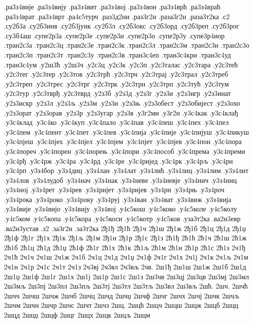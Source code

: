 {.ра3з4вије
.ра3з4вију
.ра3з4вит
.ра3з4вој
.ра3з4вон
.ра3з4врћ
.ра3з4враћ
.ра3з4врат
.ра3з4врт
.ра4с5турч
.раз3д2ни
.раз3г2н
.раза3г2н
.раза3т2ка
.с2
.су2б3а
.су2б3инв
.су2б3јунк
.су2б3л
.су2б3окс
.су2б3орд
.су2б3реп
.су2б3рог
.су3б4аш
.супе2р3а
.супе2р3е
.супе2р3и
.супе2р3о
.супе2р3у
.супе3р4иор
.тран2с3а
.тран2с3ц
.тран2с3е
.тран2с3к
.тран2с3л
.тран2с3м
.тран2с3н
.тран2с3о
.тран2с3п
.тран2с3т
.тран2с3у
.тран2с3в
.тран3с4еп
.тран3с4кри
.тран3с4уд
.тран3с4ум
.у2ш3ћ
.у2ш3ч
.у2с3ц
.у2с3к
.у2с3п
.у2с3талас
.у2с3тара
.у2с3тећ
.у2с3тег
.у2с3тер
.у2с3тов
.у2с3трћ
.у2с3трч
.у2с3трај
.у2с3трал
.у2с3треб
.у2с3треп
.у2с3трес
.у2с3трг
.у2с3трк
.у2с3трн
.у2с3трп
.у2с3тућ
.у2с3тум
.у2с3тур
.у2с3тврђ
.у2с3тврд
.у2з3б
.у2з3д
.у2з3г
.у2з3и
.у2з3игр
.у2з3инат
.у2з3искр
.у2з3л
.у2з3љ
.у2з3м
.у2з3н
.у2з3њ
.у2з3обест
.у2з3обијест
.у2з3охо
.у2з3орат
.у2з3орав
.у2з3р
.у2з3угар
.у2з3в
.у3г2ми
.у3г2н
.у3с4как
.у3с4клађ
.у3с4клад
.у3с4ко
.у3с4куп
.у3с4пало
.у3с4пав
.у3с4пеш
.у3с4пех
.у3с4пел
.у3с4пем
.у3с4пент
.у3с4пет
.у3с4пев
.у3с4пија
.у3с4пије
.у3с4пијуш
.у3с4пикуш
.у3с4пјеш
.у3с4пјех
.у3с4пјел
.у3с4пјем
.у3с4пјет
.у3с4пјев
.у3с4пон
.у3с4пора
.у3с4пореч
.у3с4порен
.у3с4порењ
.у3с4пори
.у3с4пособ
.у3с4према
.у3с4преми
.у3с4рђ
.у3с4рж
.у3с4ра
.у3с4рд
.у3с4ре
.у3с4ријед
.у3с4рк
.у3с4рљ
.у3с4рн
.у3с4рп
.у3з4бор
.у3з4диц
.у3з4лан
.у3з4лат
.у3з4лић
.у3з4лиц
.у3з4лим
.у3з4лит
.у3з4лов
.у3з4лудоб
.у3з4нач
.у3з4нак
.у3з4неве
.у3з4невје
.у3з4нич
.у3з4ниц
.у3з4ној
.у3з4рет
.у3з4рев
.у3з4ријет
.у3з4ријев
.у3з4рн
.у3з4рњ
.у3з4роч
.у3з4рока
.у3з4роко
.у3з4року
.у3з4руј
.у3з4ван
.у3з4ват
.у3з4виж
.у3з4вија
.у3з4вије
.у3з4вијо
.у3з4вију
.у3з4вој
.у4с5кош
.у4с5коко
.у4с5коле
.у4с5колу
.у4с5ком
.у4с5копа
.у4с5кора
.у4с5коси
.у4с5котр
.у4с5ков
.уза3т2ка
.ва2н3евр
.ва2н3устав
.з2
.за3г2н
.за3т2ка
2ђ1ђ
2ђ1ћ
2ђ1ч
2ђ1ш
2ђ1ж
2ђ1б
2ђ1ц
2ђ1д
2ђ1џ
2ђ1ф
2ђ1г
2ђ1х
2ђ1к
2ђ1љ
2ђ1м
2ђ1н
2ђ1р
2ђ1с
2ђ1з
2ћ1ђ
2ћ1ћ
2ћ1ч
2ћ1ш
2ћ1ж
2ћ1б
2ћ1ц
2ћ1д
2ћ1џ
2ћ1ф
2ћ1г
2ћ1х
2ћ1к
2ћ1љ
2ћ1м
2ћ1н
2ћ1р
2ћ1с
2ћ1з
2ч1ђ
2ч1ћ
2ч1ч
2ч1ш
2ч1ж
2ч1б
2ч1ц
2ч1д
2ч1џ
2ч1ф
2ч1г
2ч1х
2ч1ј
2ч1к
2ч1љ
2ч1м
2ч1н
2ч1р
2ч1с
2ч1т
2ч1з
2ч3вј
2ч3вл
2ч3вљ
2чв.
2ш1ђ
2ш1ш
2ш1ж
2ш1б
2ш1д
2ш1џ
2ш1ф
2ш1г
2ш1х
2ш1ј
2ш1р
2ш1с
2ш1з
2ш3чв
2ш3цј
2ш3цв
2ш3мј
2ш3мл
2ш3мљ
2ш3пј
2ш3пл
2ш3пљ
2ш3тј
2ш3тл
2ш3тљ
2ш3вл
2ш3вљ
2шћ.
2шч.
2шчћ
2шчч
2шчш
2шчж
2шчб
2шчц
2шчд
2шчџ
2шчф
2шчг
2шчх
2шчј
2шчк
2шчљ
2шчм
2шчн
2шчр
2шчс
2шчт
2шчз
2шц.
2шцћ
2шцч
2шцш
2шцж
2шцб
2шцц
2шцд
2шцџ
2шцф
2шцг
2шцх
2шцк
2шцљ
2шцм
}
